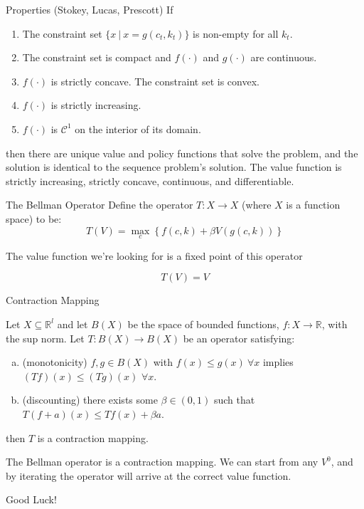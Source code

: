 \documentclass[11pt, xcolor={dvipsnames}, hyperref={colorlinks, allcolors=Blue}]{beamer}
\newcommand{\R}{\mathbb{R}}
\begin{document}
\begin{frame}{Properties (Stokey, Lucas, Prescott)}
If 
\begin{enumerate}[{A}1.]
\item The constraint set $\{x \ | \ x = g(c_{t}, k_{t})\}$ is non-empty for all $k_{t}$.
\item The constraint set is compact and $f(\cdot)$ and $g(\cdot)$ are continuous.
\item $f(\cdot)$ is strictly concave. The constraint set is convex. 
\item $f(\cdot)$ is strictly increasing.
\item $f(\cdot)$ is $\mathcal{C}^{1}$ on the interior of its domain.
\end{enumerate}
\bigskip

then there are unique value and policy functions that solve the problem, and the solution is identical to the sequence problem's solution. The value function is strictly increasing, strictly concave, continuous, and differentiable. 
\end{frame}

\begin{frame}{The Bellman Operator}
Define the operator $T:X\to X$ (where $X$ is a function space) to be:
\[T(V) = \underset{c}{\max}\left\{ f(c, k) + \beta V( g(c,k))  \right\} \]
\bigskip

The value function we're looking for is a fixed point of this operator

\[T(V) = V\]

\end{frame}

\begin{frame}{Contraction Mapping}
\begin{theorem}
Let $X\subseteq \R^{l}$ and let $B(X)$ be the space of bounded functions, $f:X \to \R$, with the sup norm. Let $T:B(X)\to B(X)$ be an operator satisfying:
	\begin{enumerate}[a)]
		\item (monotonicity) $f, g\in B(X)$ with $f(x) \leq g(x) \ \forall x$ implies $(Tf)(x) \leq (Tg)(x)$ $\forall x$.
		\item (discounting) there exists some $\beta\in(0,1)$ such that $T(f + a)(x) \leq Tf(x) + \beta a$.
	\end{enumerate}
then $T$ is a contraction mapping.
\end{theorem}
\bigskip

The Bellman operator is a contraction mapping. We can start from any $V^{0}$, and by iterating the operator will arrive at the correct value function.
\vfill\vfill
\end{frame}

\begin{frame}
\begin{center}
Good Luck!
\end{center}
\end{frame}
\end{document}
